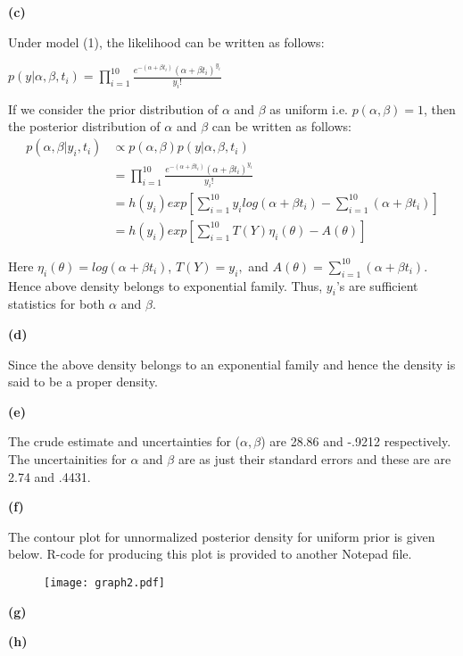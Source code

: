 \documentclass[10pt]{article}
\begin{document}
\newpage
\textbf{(c)}

Under model (1), the likelihood can be written as follows:

$p(y|\alpha,\beta,t_{i}) = \prod_{i=1}^{10}\frac{e^{-(\alpha+\beta t_{i})}(\alpha+\beta t_{i})^{y_{i}}}{y_{i}!}$

If we consider the prior distribution of $\alpha$ and $\beta$ as uniform i.e. $p(\alpha, \beta)= 1$, then the posterior distribution of $\alpha$ and $\beta$ can be written as follows:
\begin{equation*}
\begin{split}
p(\alpha,\beta|y_{i},t_{i})&\propto p(\alpha, \beta)p(y|\alpha,\beta,t_{i})\\
&=\prod_{i=1}^{10}\frac{e^{-(\alpha+\beta t_{i})}(\alpha+\beta t{_i})^{y_{i}}}{y_{i}!}\\
&=h(y_{i})exp[\sum_{i=1}^{10}y_{i}log(\alpha+\beta t_{i})-\sum_{i=1}^{10}(\alpha+\beta t_{i})]\\
&=h(y_{i})exp[\sum_{i=1}^{10}T(Y)\eta_{i}(\theta)-A(\theta)]
\end{split}
\end{equation*}

Here $\eta_{i}(\theta)=log(\alpha +\beta t_{i})$, $T(Y)=y_{i},$ and $A(\theta)=\sum_{i=1}^{10}(\alpha+\beta t_{i}).$ Hence above density belongs to exponential family. Thus, $y_{i}$'s are sufficient statistics for both $\alpha$ and $\beta$.

\textbf{(d)}

Since the above density belongs to an exponential family and hence the density is said to be a proper density.

\textbf{(e)}

The crude estimate and uncertainties for ($\alpha,\beta$) are 28.86 and -.9212 respectively. The uncertainities for $\alpha$ and $\beta$ are as just their standard errors and these are are 2.74 and .4431.

\textbf{(f)}

The contour plot for unnormalized posterior density for uniform prior is given below. R-code for producing this plot is provided to another Notepad file.

\newpage
\begin{figure}[ht]
\centering
\texttt{[image: graph2.pdf]}
\end{figure}

\textbf{(g)}



\textbf{(h)}
\end{document}

